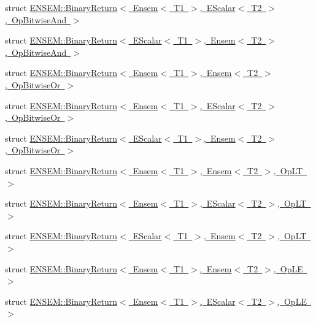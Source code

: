 \begin{DoxyCompactItemize}
\item 
struct \mbox{\hyperlink{structENSEM_1_1BinaryReturn_3_01Ensem_3_01T1_01_4_00_01EScalar_3_01T2_01_4_00_01OpBitwiseAnd_01_4}{E\+N\+S\+E\+M\+::\+Binary\+Return$<$ Ensem$<$ T1 $>$, E\+Scalar$<$ T2 $>$, Op\+Bitwise\+And $>$}}
\item 
struct \mbox{\hyperlink{structENSEM_1_1BinaryReturn_3_01EScalar_3_01T1_01_4_00_01Ensem_3_01T2_01_4_00_01OpBitwiseAnd_01_4}{E\+N\+S\+E\+M\+::\+Binary\+Return$<$ E\+Scalar$<$ T1 $>$, Ensem$<$ T2 $>$, Op\+Bitwise\+And $>$}}
\item 
struct \mbox{\hyperlink{structENSEM_1_1BinaryReturn_3_01Ensem_3_01T1_01_4_00_01Ensem_3_01T2_01_4_00_01OpBitwiseOr_01_4}{E\+N\+S\+E\+M\+::\+Binary\+Return$<$ Ensem$<$ T1 $>$, Ensem$<$ T2 $>$, Op\+Bitwise\+Or $>$}}
\item 
struct \mbox{\hyperlink{structENSEM_1_1BinaryReturn_3_01Ensem_3_01T1_01_4_00_01EScalar_3_01T2_01_4_00_01OpBitwiseOr_01_4}{E\+N\+S\+E\+M\+::\+Binary\+Return$<$ Ensem$<$ T1 $>$, E\+Scalar$<$ T2 $>$, Op\+Bitwise\+Or $>$}}
\item 
struct \mbox{\hyperlink{structENSEM_1_1BinaryReturn_3_01EScalar_3_01T1_01_4_00_01Ensem_3_01T2_01_4_00_01OpBitwiseOr_01_4}{E\+N\+S\+E\+M\+::\+Binary\+Return$<$ E\+Scalar$<$ T1 $>$, Ensem$<$ T2 $>$, Op\+Bitwise\+Or $>$}}
\item 
struct \mbox{\hyperlink{structENSEM_1_1BinaryReturn_3_01Ensem_3_01T1_01_4_00_01Ensem_3_01T2_01_4_00_01OpLT_01_4}{E\+N\+S\+E\+M\+::\+Binary\+Return$<$ Ensem$<$ T1 $>$, Ensem$<$ T2 $>$, Op\+L\+T $>$}}
\item 
struct \mbox{\hyperlink{structENSEM_1_1BinaryReturn_3_01Ensem_3_01T1_01_4_00_01EScalar_3_01T2_01_4_00_01OpLT_01_4}{E\+N\+S\+E\+M\+::\+Binary\+Return$<$ Ensem$<$ T1 $>$, E\+Scalar$<$ T2 $>$, Op\+L\+T $>$}}
\item 
struct \mbox{\hyperlink{structENSEM_1_1BinaryReturn_3_01EScalar_3_01T1_01_4_00_01Ensem_3_01T2_01_4_00_01OpLT_01_4}{E\+N\+S\+E\+M\+::\+Binary\+Return$<$ E\+Scalar$<$ T1 $>$, Ensem$<$ T2 $>$, Op\+L\+T $>$}}
\item 
struct \mbox{\hyperlink{structENSEM_1_1BinaryReturn_3_01Ensem_3_01T1_01_4_00_01Ensem_3_01T2_01_4_00_01OpLE_01_4}{E\+N\+S\+E\+M\+::\+Binary\+Return$<$ Ensem$<$ T1 $>$, Ensem$<$ T2 $>$, Op\+L\+E $>$}}
\item 
struct \mbox{\hyperlink{structENSEM_1_1BinaryReturn_3_01Ensem_3_01T1_01_4_00_01EScalar_3_01T2_01_4_00_01OpLE_01_4}{E\+N\+S\+E\+M\+::\+Binary\+Return$<$ Ensem$<$ T1 $>$, E\+Scalar$<$ T2 $>$, Op\+L\+E $>$}}
\item 

\end{DoxyCompactItemize}
